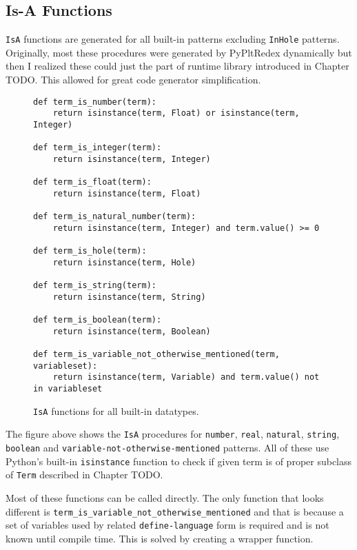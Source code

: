 \subsection{Is-A Functions}

\texttt{IsA} functions are generated for all built-in patterns excluding \texttt{InHole} patterns.  Originally, most these procedures were generated by PyPltRedex dynamically but then I realized these could just the part of runtime library introduced in Chapter TODO. This allowed for great code generator simplification.

\begin{figure}[H]
\begin{verbatim}
def term_is_number(term):
    return isinstance(term, Float) or isinstance(term, Integer)

def term_is_integer(term):
    return isinstance(term, Integer) 

def term_is_float(term):
    return isinstance(term, Float) 

def term_is_natural_number(term):
    return isinstance(term, Integer) and term.value() >= 0

def term_is_hole(term):
    return isinstance(term, Hole) 

def term_is_string(term):
    return isinstance(term, String) 

def term_is_boolean(term):
    return isinstance(term, Boolean) 

def term_is_variable_not_otherwise_mentioned(term, variableset):
    return isinstance(term, Variable) and term.value() not in variableset
\end{verbatim}
\caption{\texttt{IsA} functions for all built-in datatypes.}
\label{codegen-builtin-isa}
\end{figure}

The figure above shows the \texttt{IsA} procedures for \texttt{number}, \texttt{real}, \texttt{natural}, \texttt{string}, \texttt{boolean} and \texttt{variable-not-otherwise-mentioned} patterns. All of these use Python's built-in \texttt{isinstance} function to check if given term is of proper subclass of \texttt{Term} described in Chapter TODO.

Most of these functions can be called directly. The only function that looks different is \texttt{term\_is\_variable\_not\_otherwise\_mentioned} and that is because a set of variables used by related \texttt{define-language} form is required and is not known until compile time. This is solved by creating a wrapper function. 

